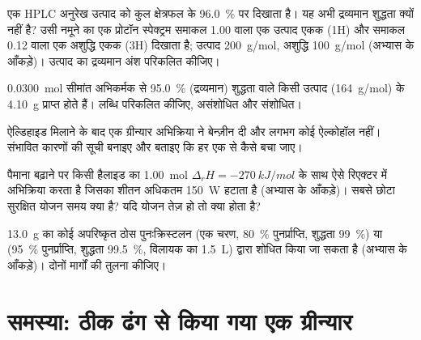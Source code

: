 \begin{exercise}[$\star\star$]\label{exo:b2:lab-techniques-2:8}
एक HPLC अनुरेख उत्पाद को कुल क्षेत्रफल के 96.0~\% पर दिखाता है। यह अभी द्रव्यमान शुद्धता क्यों नहीं है? उसी नमूने का
एक प्रोटॉन स्पेक्ट्रम समाकल 1.00 वाला एक उत्पाद एकक (1H) और समाकल 0.12 वाला एक अशुद्धि एकक
(3H) दिखाता है; उत्पाद \qty{200}{g/mol}, अशुद्धि \qty{100}{g/mol} (अभ्यास के आँकड़े)। उत्पाद का
द्रव्यमान अंश परिकलित कीजिए।
\end{exercise}

\begin{exercise}[$\star\star$]\label{exo:b2:lab-techniques-2:9}
\qty{0.0300}{mol} सीमांत अभिकर्मक से 95.0~\% (द्रव्यमान) शुद्धता वाले किसी उत्पाद (\qty{164}{g/mol}) के \qty{4.10}{g}
प्राप्त होते हैं। लब्धि परिकलित कीजिए, असंशोधित और संशोधित।
\end{exercise}

\begin{exercise}[$\star\star\star$]\label{exo:b2:lab-techniques-2:10}
ऐल्डिहाइड मिलाने के बाद एक ग्रीन्यार अभिक्रिया ने बेन्ज़ीन दी और लगभग कोई ऐल्कोहॉल नहीं। संभावित
कारणों की सूची बनाइए और बताइए कि हर एक से कैसे बचा जाए।
\end{exercise}

\begin{exercise}[$\star\star\star$]\label{exo:b2:lab-techniques-2:11}
पैमाना बढ़ाने पर किसी हैलाइड का \qty{1.00}{mol} $\Delta_rH = \qty{-270}{kJ/mol}$ के साथ ऐसे रिएक्टर में अभिक्रिया करता है जिसका
शीतन अधिकतम \qty{150}{W} हटाता है (अभ्यास के आँकड़े)। सबसे छोटा सुरक्षित योजन समय क्या है? यदि योजन
तेज़ हो तो क्या होता है?
\end{exercise}

\begin{exercise}[$\star\star\star$]\label{exo:b2:lab-techniques-2:12}
\qty{13.0}{g} का कोई अपरिष्कृत ठोस पुनःक्रिस्टलन (एक चरण, 80~\% पुनर्प्राप्ति, शुद्धता
99~\%) या  (95~\% पुनर्प्राप्ति, शुद्धता 99.5~\%, विलायक का \qty{1.5}{L}) द्वारा शोधित किया जा सकता है (अभ्यास के
आँकड़े)। दोनों मार्गों की तुलना कीजिए।
\end{exercise}

\section{समस्या: ठीक ढंग से किया गया एक ग्रीन्यार}


